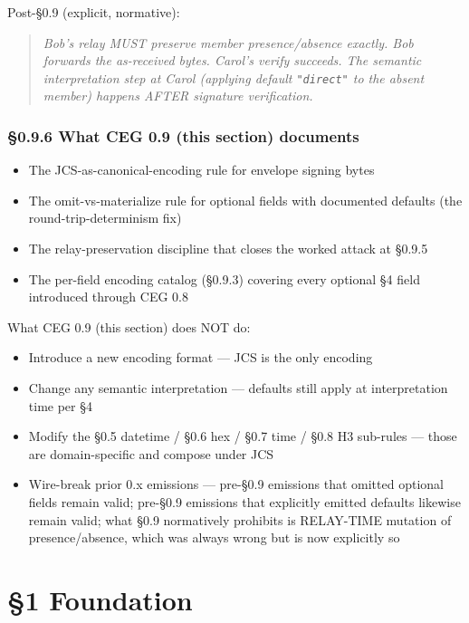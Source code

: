 \documentclass[10pt]{article}
\begin{document}
Post-§0.9 (explicit, normative):


\begin{quote}\itshape Bob's relay MUST preserve member presence/absence exactly. Bob forwards the as-received bytes. Carol's verify succeeds. The semantic interpretation step at Carol (applying default \texttt{"direct"} to the absent member) happens AFTER signature verification.\end{quote}


\subsubsection*{§0.9.6 What CEG 0.9 (this section) documents}


\begin{itemize}\setlength\itemsep{0pt}
\item The JCS-as-canonical-encoding rule for envelope signing bytes
\item The omit-vs-materialize rule for optional fields with documented defaults (the round-trip-determinism fix)
\item The relay-preservation discipline that closes the worked attack at §0.9.5
\item The per-field encoding catalog (§0.9.3) covering every optional §4 field introduced through CEG 0.8
\end{itemize}


What CEG 0.9 (this section) does NOT do:

\begin{itemize}\setlength\itemsep{0pt}
\item Introduce a new encoding format — JCS is the only encoding
\item Change any semantic interpretation — defaults still apply at interpretation time per §4
\item Modify the §0.5 datetime / §0.6 hex / §0.7 time / §0.8 H3 sub-rules — those are domain-specific and compose under JCS
\item Wire-break prior 0.x emissions — pre-§0.9 emissions that omitted optional fields remain valid; pre-§0.9 emissions that explicitly emitted defaults likewise remain valid; what §0.9 normatively prohibits is RELAY-TIME mutation of presence/absence, which was always wrong but is now explicitly so
\end{itemize}




\clearpage


\section*{§1 Foundation}
\end{document}
